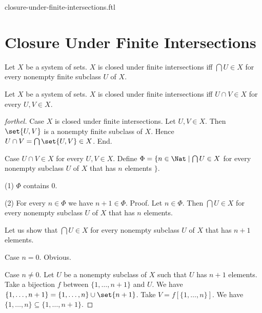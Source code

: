 \documentclass{naproche-library}
\begin{document}
\begin{smodule}{closure-under-finite-intersections.ftl}

  \section*{Closure Under Finite Intersections}

  \begin{definition}[forthel,id=FOUNDATIONS_14_4297814324543488]
    Let $X$ be a system of sets.
    $X$ is closed under finite intersections iff $\bigcap U \in X$ for every nonempty finite subclass $U$ of $X$.
  \end{definition}

  \begin{proposition}[forthel,id=FOUNDATIONS_17_1405012582334464]
    Let $X$ be a system of sets.
    $X$ is closed under finite intersections iff $U \cap V \in X$ for every $U, V \in X$.
  \end{proposition}
  \begin{proof}[forthel]
    Case $X$ is closed under finite intersections.
      Let $U, V \in X$.
      Then $\set{U, V}$ is a nonempty finite subclass of $X$.
      Hence $U \cap V = \bigcap \set{U, V} \in X$.
    End.

    Case $U \cap V \in X$ for every $U, V \in X$.
      Define $\Phi = \{ n \in \Nat \mid \bigcap U \in X$ for every nonempty subclass $U$ of $X$ that has $n$ elements $\}$.

      (1) $\Phi$ contains $0$.

      (2) For every $n \in \Phi$ we have $n + 1 \in \Phi$. \newline
      Proof.
        Let $n \in \Phi$.
        Then $\bigcap U \in X$ for every nonempty subclass $U$ of $X$ that has $n$ elements.

        Let us show that $\bigcap U \in X$ for every nonempty subclass $U$ of $X$ that has $n + 1$ elements.

          Case $n = 0$. Obvious.

          Case $n \neq 0$.
            Let $U$ be a nonempty subclass of $X$ such that $U$ has $n + 1$ elements.
            Take a bijection $f$ between $\{1, \dots, n + 1 \}$ and $U$.
            We have $\{ 1, \dots, n + 1 \} = \{ 1, \dots, n \} \cup \set{n + 1}$.
            Take $V = f[\{ 1, \dots, n \}]$.
            We have $\{ 1, \dots, n \} \subseteq \{ 1, \dots, n + 1 \}$.


\end{proof}
\end{smodule}
\end{document}
